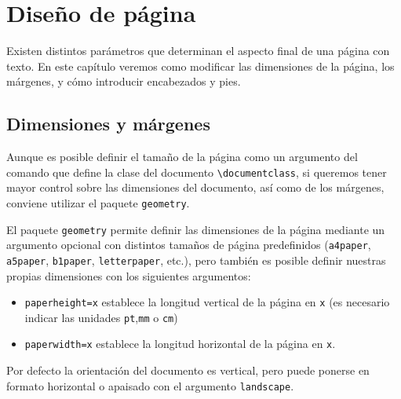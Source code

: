 \documentclass[
  a4paper,
]{scrreport}
\providecommand{\tightlist}{%
  \setlength{\itemsep}{0pt}\setlength{\parskip}{0pt}}\usepackage{longtable,booktabs,array}
\theoremstyle{definition}
\theoremstyle{remark}
\begin{document}

\chapter{Diseño de página}\label{diseuxf1o-de-puxe1gina}

Existen distintos parámetros que determinan el aspecto final de una
página con texto. En este capítulo veremos como modificar las
dimensiones de la página, los márgenes, y cómo introducir encabezados y
pies.

\section{Dimensiones y márgenes}\label{dimensiones-y-muxe1rgenes}

Aunque es posible definir el tamaño de la página como un argumento del
comando que define la clase del documento
\texttt{\textbackslash{}documentclass}, si queremos tener mayor control
sobre las dimensiones del documento, así como de los márgenes, conviene
utilizar el paquete \texttt{geometry}.

El paquete \texttt{geometry} permite definir las dimensiones de la
página mediante un argumento opcional con distintos tamaños de página
predefinidos (\texttt{a4paper}, \texttt{a5paper}, \texttt{b1paper},
\texttt{letterpaper}, etc.), pero también es posible definir nuestras
propias dimensiones con los siguientes argumentos:

\begin{itemize}
\tightlist
\item
  \texttt{paperheight=x} establece la longitud vertical de la página en
  \texttt{x} (es necesario indicar las unidades \texttt{pt},\texttt{mm}
  o \texttt{cm})
\item
  \texttt{paperwidth=x} establece la longitud horizontal de la página en
  \texttt{x}.
\end{itemize}

Por defecto la orientación del documento es vertical, pero puede ponerse
en formato horizontal o apaisado con el argumento \texttt{landscape}.
\end{document}
